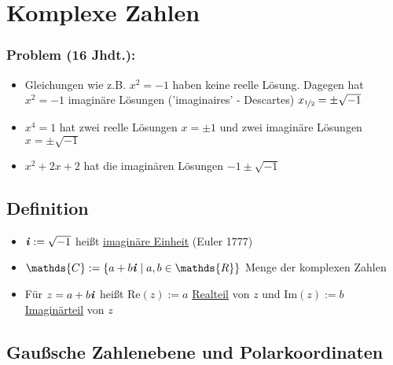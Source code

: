 \documentclass[12pt,titlepage, pdf]{article}
\newcommand{\R}{\mathds{R}}
\newcommand{\uline}[1]{\underline{#1}}
\renewcommand{\Re}[1]{\text{Re}(#1)}
\renewcommand{\Im}[1]{\text{Im}(#1)}
\renewcommand{\i}{\textbf{\textit{i}}}
\renewcommand{\>}{\rightarrow}
\renewcommand{\*}{\cdot}
\begin{document}
		      	\section{Komplexe Zahlen}
		      	\label{5}
		      	\subsubsection*{Problem (16 Jhdt.):} 
		      	\begin{itemize}
		      		\item Gleichungen wie z.B. $x^2 = -1$ haben keine reelle Lösung. Dagegen hat\\ $x^2 = -1$ imaginäre Lösungen ('imaginaires' - Descartes) $x_{\nicefrac{1}{2}} = \pm \sqrt{-1}$
		      		\item $x^4 = 1$ hat zwei reelle Lösungen $x = \pm 1$ und zwei imaginäre Lösungen $x = \pm \sqrt{-1}$
		      		\item $x^2 + 2x +2$ hat die imaginären Lösungen $-1 \pm \sqrt{-1}$
		      	\end{itemize}
		      	\subsection{Definition}
		      	\begin{itemize}
		      		\item $\i  := \sqrt{-1}$ heißt \uline{imaginäre Einheit} (Euler 1777)
		      		\item $\mathds{C} := \{a +b\i \mid a,b \in \R \}$ Menge der komplexen Zahlen
		      		\item Für $z = a +b\i$ heißt $\Re{z} :=a$ \uline{Realteil} von $z$ und $\Im{z} := b$ \uline{Imaginärteil} von $z$
		      	\end{itemize}
		      	\subsection*{Gaußsche Zahlenebene und Polarkoordinaten}
\end{document}
